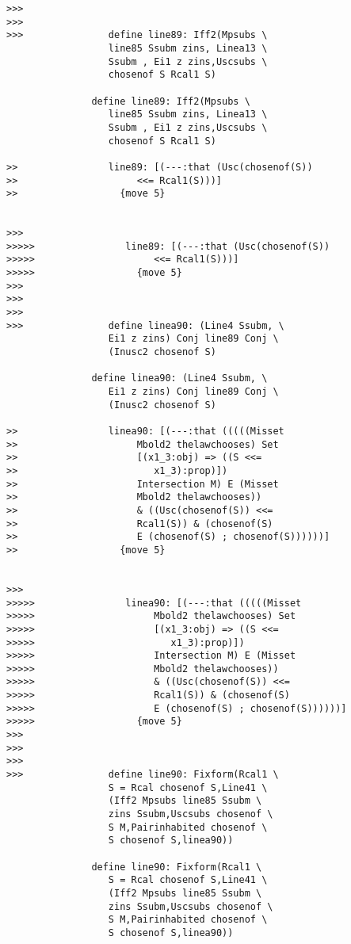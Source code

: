 \documentclass[12pt]{article}
\begin{document}
\begin{verbatim}
>>>
>>>
>>>               define line89: Iff2(Mpsubs \
                  line85 Ssubm zins, Linea13 \
                  Ssubm , Ei1 z zins,Uscsubs \
                  chosenof S Rcal1 S)

               define line89: Iff2(Mpsubs \
                  line85 Ssubm zins, Linea13 \
                  Ssubm , Ei1 z zins,Uscsubs \
                  chosenof S Rcal1 S)

>>                line89: [(---:that (Usc(chosenof(S))
>>                     <<= Rcal1(S)))]
>>                  {move 5}


>>>
>>>>>                line89: [(---:that (Usc(chosenof(S))
>>>>>                     <<= Rcal1(S)))]
>>>>>                  {move 5}
>>>
>>>
>>>
>>>               define linea90: (Line4 Ssubm, \
                  Ei1 z zins) Conj line89 Conj \
                  (Inusc2 chosenof S)

               define linea90: (Line4 Ssubm, \
                  Ei1 z zins) Conj line89 Conj \
                  (Inusc2 chosenof S)

>>                linea90: [(---:that (((((Misset
>>                     Mbold2 thelawchooses) Set
>>                     [(x1_3:obj) => ((S <<=
>>                        x1_3):prop)])
>>                     Intersection M) E (Misset
>>                     Mbold2 thelawchooses))
>>                     & ((Usc(chosenof(S)) <<=
>>                     Rcal1(S)) & (chosenof(S)
>>                     E (chosenof(S) ; chosenof(S))))))]
>>                  {move 5}


>>>
>>>>>                linea90: [(---:that (((((Misset
>>>>>                     Mbold2 thelawchooses) Set
>>>>>                     [(x1_3:obj) => ((S <<=
>>>>>                        x1_3):prop)])
>>>>>                     Intersection M) E (Misset
>>>>>                     Mbold2 thelawchooses))
>>>>>                     & ((Usc(chosenof(S)) <<=
>>>>>                     Rcal1(S)) & (chosenof(S)
>>>>>                     E (chosenof(S) ; chosenof(S))))))]
>>>>>                  {move 5}
>>>
>>>
>>>
>>>               define line90: Fixform(Rcal1 \
                  S = Rcal chosenof S,Line41 \
                  (Iff2 Mpsubs line85 Ssubm \
                  zins Ssubm,Uscsubs chosenof \
                  S M,Pairinhabited chosenof \
                  S chosenof S,linea90))

               define line90: Fixform(Rcal1 \
                  S = Rcal chosenof S,Line41 \
                  (Iff2 Mpsubs line85 Ssubm \
                  zins Ssubm,Uscsubs chosenof \
                  S M,Pairinhabited chosenof \
                  S chosenof S,linea90))


\end{verbatim}
\end{document}
